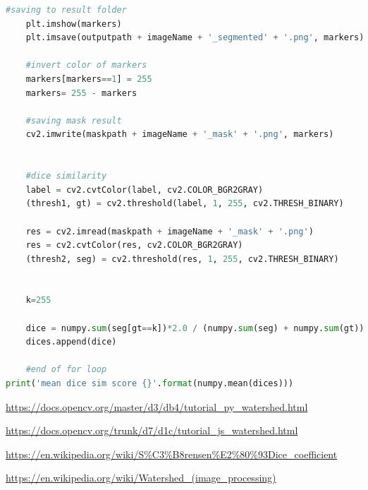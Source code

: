 \documentclass[10pt]{article}
\begin{document}
\begin{lstlisting}[language=Python]
    #saving to result folder
    plt.imshow(markers)
    plt.imsave(outputpath + imageName + '_segmented' + '.png', markers)

    #invert color of markers
    markers[markers==1] = 255
    markers= 255 - markers

    #saving mask result
    cv2.imwrite(maskpath + imageName + '_mask' + '.png', markers)
    

    #dice similarity
    label = cv2.cvtColor(label, cv2.COLOR_BGR2GRAY)
    (thresh1, gt) = cv2.threshold(label, 1, 255, cv2.THRESH_BINARY)

    res = cv2.imread(maskpath + imageName + '_mask' + '.png')
    res = cv2.cvtColor(res, cv2.COLOR_BGR2GRAY)
    (thresh2, seg) = cv2.threshold(res, 1, 255, cv2.THRESH_BINARY)


    k=255

    dice = numpy.sum(seg[gt==k])*2.0 / (numpy.sum(seg) + numpy.sum(gt))
    dices.append(dice)

    #end of for loop
print('mean dice sim score {}'.format(numpy.mean(dices)))
\end{lstlisting}
\clearpage
\begin{thebibliography}{9}
\url{https://docs.opencv.org/master/d3/db4/tutorial_py_watershed.html}

\url{https://docs.opencv.org/trunk/d7/d1c/tutorial_js_watershed.html}

\url{https://en.wikipedia.org/wiki/S\%C3\%B8rensen\%E2\%80\%93Dice_coefficient}

\url{https://en.wikipedia.org/wiki/Watershed_(image_processing)}
\end{thebibliography}
\end{document}
